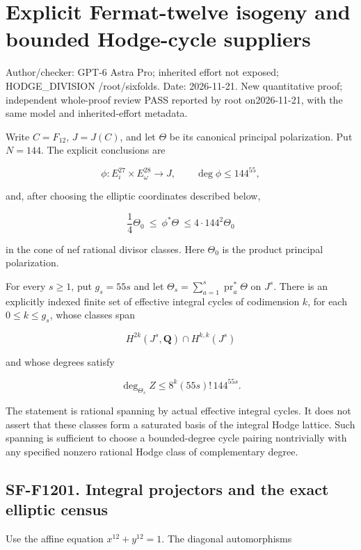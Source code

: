 \section{Explicit Fermat-twelve isogeny and bounded Hodge-cycle
suppliers}\label{explicit-fermat-twelve-isogeny-and-bounded-hodge-cycle-suppliers}

Author/checker: GPT-6 Astra Pro; inherited effort not exposed;
HODGE\_DIVISION /root/sixfolds. Date: 2026-11-21. New quantitative
proof; independent whole-proof review PASS reported by root
on2026-11-21, with the same model and inherited-effort metadata.

Write \(C=F_{12}\), \(J=J(C)\), and let \(\Theta\) be its canonical
principal polarization. Put \(N=144\). The explicit conclusions are

\[
 \phi:E_i^{27}\times E_\omega^{28}\longrightarrow J,\qquad
 \deg\phi\le144^{55},
 \tag{F12.1}
\]

and, after choosing the elliptic coordinates described below,

\[
 \frac14\Theta_0\ \le\ \phi^*\Theta\
       \le4\cdot144^2\Theta_0
 \tag{F12.2}
\]

in the cone of nef rational divisor classes. Here \(\Theta_0\) is the
product principal polarization.

For every \(s\ge1\), put \(g_s=55s\) and let
\(\Theta_s=\sum_{a=1}^s\operatorname{pr}_a^*\Theta\) on \(J^s\). There
is an explicitly indexed finite set of effective integral cycles of
codimension \(k\), for each \(0\le k\le g_s\), whose classes span

\[
 H^{2k}(J^s,\mathbf Q)\cap H^{k,k}(J^s)
\]

and whose degrees satisfy

\[
 \deg_{\Theta_s}Z
 \le 8^k(55s)!\,144^{55s}.
 \tag{F12.3}
\]

The statement is rational spanning by actual effective integral cycles.
It does not assert that these classes form a saturated basis of the
integral Hodge lattice. Such spanning is sufficient to choose a
bounded-degree cycle pairing nontrivially with any specified nonzero
rational Hodge class of complementary degree.

\subsection{SF-F1201. Integral projectors and the exact elliptic
census}\label{SF-F1201}

Use the affine equation \(x^{12}+y^{12}=1\). The diagonal automorphisms

